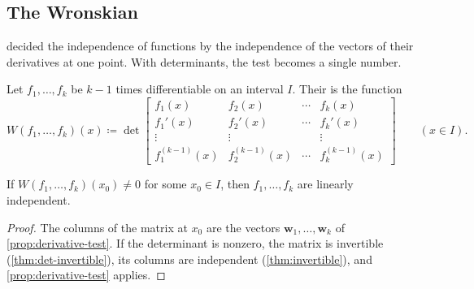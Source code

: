 \subsection{The Wronskian}

 decided the independence of functions by the independence of the vectors of their derivatives at one point. With determinants, the test becomes a single number.

\begin{definition}[Wronskian]
\label{def:wronskian}
Let $f_1,\ldots,f_k$ be $k-1$ times differentiable on an interval $I$. Their  is the function
\[
W(f_1,\ldots,f_k)(x)\coloneqq\det\begin{bmatrix}f_1(x)&f_2(x)&\cdots&f_k(x)\\f_1'(x)&f_2'(x)&\cdots&f_k'(x)\\\vdots&\vdots&&\vdots\\f_1^{(k-1)}(x)&f_2^{(k-1)}(x)&\cdots&f_k^{(k-1)}(x)\end{bmatrix}\qquad(x\in I).
\]
\end{definition}

\begin{proposition}
\label{prop:wronskian-test}
If $W(f_1,\ldots,f_k)(x_0)\ne0$ for some $x_0\in I$, then $f_1,\ldots,f_k$ are linearly independent.
\end{proposition}

\begin{proof}
The columns of the matrix at $x_0$ are the vectors $\mathbf w_1,\ldots,\mathbf w_k$ of \cref{prop:derivative-test}. If the determinant is nonzero, the matrix is invertible (\cref{thm:det-invertible}), its columns are independent (\cref{thm:invertible}), and \cref{prop:derivative-test} applies.
\end{proof}

